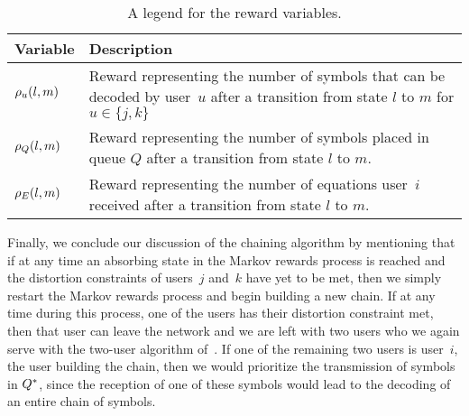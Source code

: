 \begin{table}
	\begin{center}
		\begin{tabular}{l |  p{8cm}}
			Variable              & Description  \\
			\hline
			$\rho_{u}(l, m)$ & Reward representing the number of symbols that can be decoded by user~$u$ after a transition from state $l$ to $m$ for $u \in \{j , k\}$ \\
			$\rho_{Q}(l, m)$ &Reward representing the number of symbols placed in queue $Q$ after a transition from state $l$ to $m$.  \\
			$\rho_{E}(l, m)$ &Reward representing the number of equations user~$i$ received after a transition from state $l$ to $m$. \\
		\end{tabular}
	\end{center}
	\caption{A legend for the reward variables.}	
	\label{tab:reward_variables}
\end{table}





Finally, we conclude our discussion of the chaining algorithm by mentioning that if at any time an absorbing state in the Markov rewards process is reached and the distortion constraints of users~$j$ and~$k$ have yet to be met, then we simply restart the Markov rewards process and begin building a new chain.  If at any time during this process, one of the users has their distortion constraint met, then that user can leave the network and we are left with two users who we again serve with the two-user algorithm of~\cite{TMKS_TIT20}.  If one of the remaining two users is user~$i$, the user building the chain, then we would prioritize the transmission of symbols in $Q^{*}$, since the reception of one of these symbols would lead to the decoding of an entire chain of symbols. 